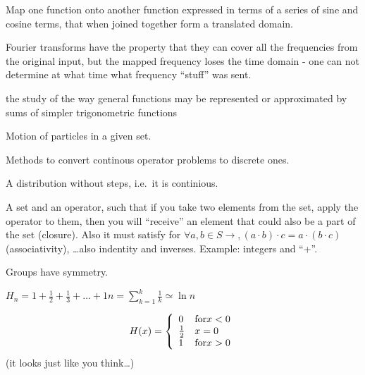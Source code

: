 \begin{definition}
    Map one function onto another function expressed in terms of a 
    series of sine and cosine terms, that when joined together form
    a translated domain.

    Fourier transforms have the property that they can cover all the frequencies
    from the original input, but the mapped frequency loses the time domain -
    one can not determine at what time what frequency ``stuff''  was sent.

\end{definition}

\begin{definition}
    the study of the way general functions may be represented or approximated
    by sums of simpler trigonometric functions

\end{definition}

\begin{definition}[Flow]
    Motion of particles in a given set.
\end{definition}

\begin{definition}
    Methods to convert continous operator problems to discrete ones.
\end{definition}

\begin{definition}
   A distribution without steps, i.e.\ it is continious. 
\end{definition}

\begin{definition}[Group]
    A set and an operator, such that if you take two elements from the set,
    apply the operator to them, then you will ``receive'' an element that
    could also be a part of the set (closure). Also it must satisfy for
    $\forall{a,b} \in S \rightarrow, (a \cdot b) \cdot c = a \cdot (b \cdot c)$ (associativity),
    \dots also indentity and inverses.
    Example: integers and ``+''.

    Groups have symmetry.
\end{definition}

\begin{definition}
    $H_{n} = 1 + \frac{1}{2} + \frac{1}{3} + \dots + {1}{n} =
    {\sum\limits_{k = 1}^{k}} \frac{1}{k} \simeq \ln n$
\end{definition}

\begin{definition}
    $$
    H(x) = \left\{
            \begin{array}{l l}
                0 & \text{for} x < 0 \\
                \frac{1}{2} & x = 0 \\
                1 & \text{for} x > 0 \\
            \end{array}
        \right.
    $$
    (it looks just like you think\dots)
\end{definition}

